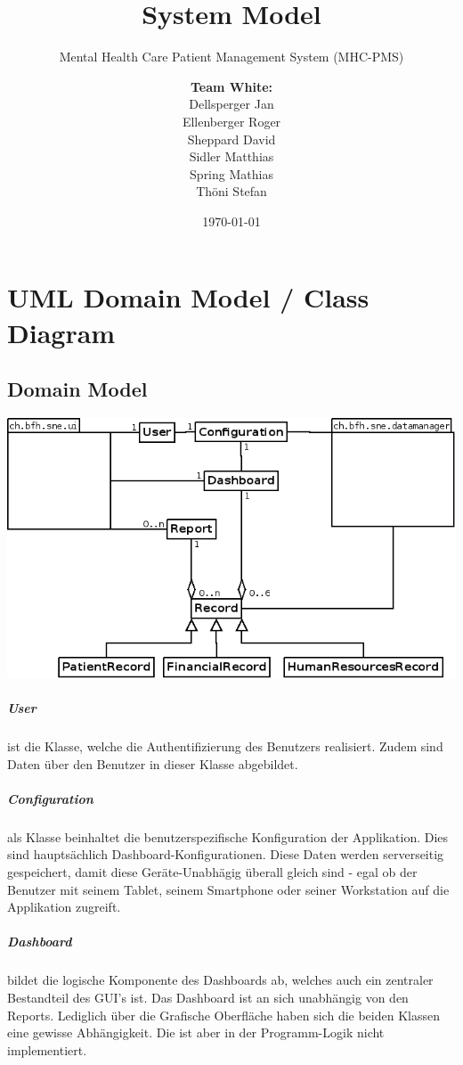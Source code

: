 \documentclass[a4paper]{scrreprt}
\title{System Model}
\subtitle{Mental Health Care Patient Management System (MHC-PMS)}
\author{
\begin{tabular}{l}
\normalfont\bfseries{Team White:}\\
Dellsperger Jan\\
Ellenberger Roger\\
Sheppard David\\
Sidler Matthias\\
Spring Mathias\\
Thöni Stefan
\end{tabular}
}
\date{\today}
\begin{document}
\begin{titlepage}
	\maketitle
\end{titlepage}

\chapter{UML Domain Model / Class Diagram}

\section{Domain Model}

\includegraphics[width=1\textwidth]{./class-diagram.png}

\paragraph{User} ist die Klasse, welche die Authentifizierung des Benutzers realisiert. Zudem sind  Daten über den Benutzer in dieser Klasse abgebildet.

\paragraph{Configuration} als Klasse beinhaltet die benutzerspezifische Konfiguration der Applikation. Dies sind hauptsächlich Dashboard-Konfigurationen. Diese Daten werden serverseitig gespeichert, damit diese Geräte-Unabhägig überall gleich sind - egal ob der Benutzer mit seinem Tablet, seinem Smartphone oder seiner Workstation auf die Applikation zugreift.

\paragraph{Dashboard} bildet die logische Komponente des Dashboards ab, welches auch ein zentraler Bestandteil des GUI's ist. Das Dashboard ist an sich unabhängig von den Reports. Lediglich über die Grafische Oberfläche haben sich die beiden Klassen eine gewisse Abhängigkeit. Die ist aber in der Programm-Logik nicht implementiert.
\end{document}
